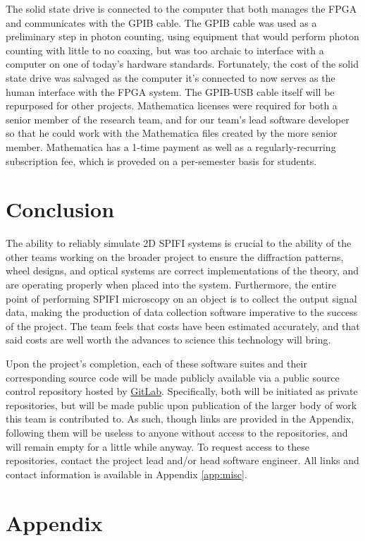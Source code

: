 \documentclass[12pt]{article}
\begin{document}
The solid state drive is connected to the computer that both manages the FPGA and communicates with the GPIB cable. The GPIB cable was used as a preliminary step in photon counting, using equipment that would perform photon counting with little to no coaxing, but was too archaic to interface with a computer on one of today's hardware standards. Fortunately, the cost of the solid state drive was salvaged as the computer it's connected to now serves as the human interface with the FPGA system. The GPIB-USB cable itself will be repurposed for other projects. Mathematica licenses were required for both a senior member of the research team, and for our team's lead software developer so that he could work with the Mathematica files created by the more senior member. Mathematica has a 1-time payment as well as a regularly-recurring subscription fee, which is proveded on a per-semester basis for students.

\section*{Conclusion}
The ability to reliably simulate 2D SPIFI systems is crucial to the ability
of the other teams working on the broader project to ensure the diffraction
patterns, wheel designs, and optical systems are correct implementations of
the theory, and are operating properly when placed into the system.
Furthermore, the entire point of performing SPIFI microscopy on an object
is to collect the output signal data, making the production of data
collection software imperative to the success of the project. The team
feels that costs have been estimated accurately, and that said costs are
well worth the advances to science this technology will bring.

Upon the project's completion, each of these software suites and their
corresponding source code will be made publicly available via a public
source control repository hosted by \href{http://www.gitlab.com}{GitLab}.
Specifically, both will be initiated as private repositories, but will be
made public upon publication of the larger body of work this team is
contributed to. As such, though links are provided in the Appendix,
following them will be useless to anyone without access to the
repositories, and will remain empty for a little while anyway. To request
access to these repositories, contact the project lead and/or head
software engineer. All links and contact information is available in
Appendix \ref{app:misc}.

\newpage
\section*{Appendix}
\appendix
\end{document}
